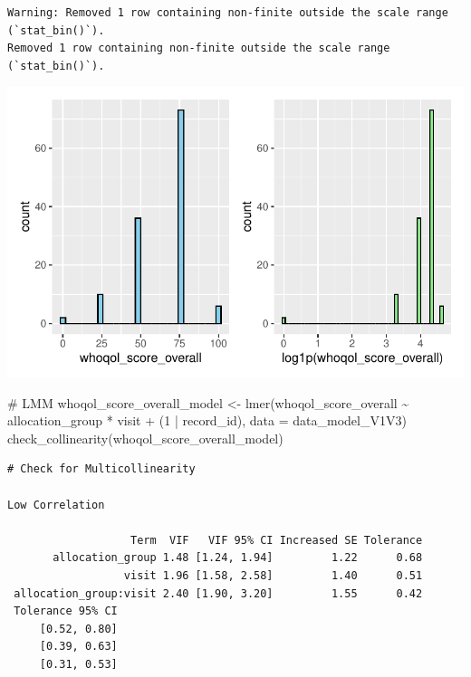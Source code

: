 \documentclass[
  letterpaper,
  DIV=11,
  numbers=noendperiod]{scrartcl}
\newenvironment{Shaded}{\begin{snugshade}}{\end{snugshade}}
\newcommand{\AttributeTok}[1]{\textcolor[rgb]{0.40,0.45,0.13}{#1}}
\newcommand{\CommentTok}[1]{\textcolor[rgb]{0.37,0.37,0.37}{#1}}
\newcommand{\DecValTok}[1]{\textcolor[rgb]{0.68,0.00,0.00}{#1}}
\newcommand{\FunctionTok}[1]{\textcolor[rgb]{0.28,0.35,0.67}{#1}}
\newcommand{\NormalTok}[1]{\textcolor[rgb]{0.00,0.23,0.31}{#1}}
\newcommand{\OtherTok}[1]{\textcolor[rgb]{0.00,0.23,0.31}{#1}}
\newcommand{\SpecialCharTok}[1]{\textcolor[rgb]{0.37,0.37,0.37}{#1}}
\begin{document}
\begin{verbatim}
Warning: Removed 1 row containing non-finite outside the scale range (`stat_bin()`).
Removed 1 row containing non-finite outside the scale range (`stat_bin()`).
\end{verbatim}

\includegraphics{Outcomes_V1V2V3_files/figure-pdf/whoqol_score_overall_1-1.pdf}

\begin{Shaded}
\begin{Highlighting}[]
\CommentTok{\# LMM}
\NormalTok{whoqol\_score\_overall\_model }\OtherTok{\textless{}{-}} \FunctionTok{lmer}\NormalTok{(whoqol\_score\_overall }\SpecialCharTok{\textasciitilde{}}\NormalTok{ allocation\_group }\SpecialCharTok{*}\NormalTok{ visit }\SpecialCharTok{+}\NormalTok{ (}\DecValTok{1} \SpecialCharTok{|}\NormalTok{ record\_id), }\AttributeTok{data =}\NormalTok{ data\_model\_V1V3)}
\FunctionTok{check\_collinearity}\NormalTok{(whoqol\_score\_overall\_model)}
\end{Highlighting}
\end{Shaded}

\begin{verbatim}
# Check for Multicollinearity

Low Correlation

                   Term  VIF   VIF 95% CI Increased SE Tolerance
       allocation_group 1.48 [1.24, 1.94]         1.22      0.68
                  visit 1.96 [1.58, 2.58]         1.40      0.51
 allocation_group:visit 2.40 [1.90, 3.20]         1.55      0.42
 Tolerance 95% CI
     [0.52, 0.80]
     [0.39, 0.63]
     [0.31, 0.53]
\end{verbatim}
\end{document}
